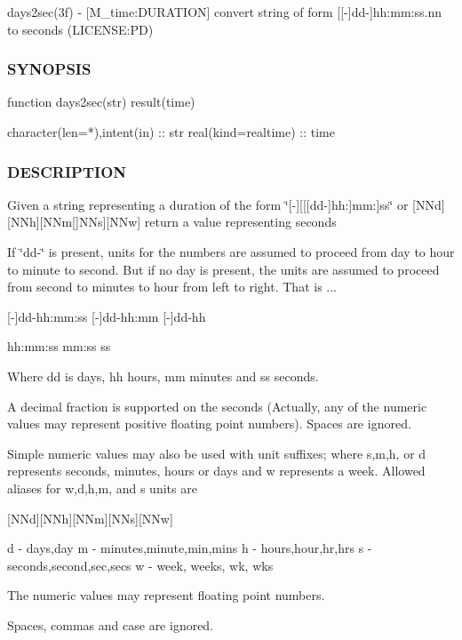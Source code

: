 days2sec(3f) -\/ \mbox{[}M\+\_\+time\+:D\+U\+R\+A\+T\+I\+ON\mbox{]} convert string of form \mbox{[}\mbox{[}-\/\mbox{]}dd-\/\mbox{]}hh\+:mm\+:ss.\+nn to seconds (L\+I\+C\+E\+N\+SE\+:PD) 

\subsubsection*{S\+Y\+N\+O\+P\+S\+IS}

\begin{DoxyVerb}function days2sec(str) result(time)

 character(len=*),intent(in)       :: str
 real(kind=realtime)               :: time
\end{DoxyVerb}


\subsubsection*{D\+E\+S\+C\+R\+I\+P\+T\+I\+ON}

Given a string representing a duration of the form \char`\"{}\mbox{[}-\/\mbox{]}\mbox{[}\mbox{[}\mbox{[}dd-\/\mbox{]}hh\+:\mbox{]}mm\+:\mbox{]}ss\char`\"{} or \mbox{[}N\+Nd\mbox{]}\mbox{[}N\+Nh\mbox{]}\mbox{[}N\+Nm\mbox{[}\mbox{]}N\+Ns\mbox{]}\mbox{[}N\+Nw\mbox{]} return a value representing seconds

If \char`\"{}dd-\/\char`\"{} is present, units for the numbers are assumed to proceed from day to hour to minute to second. But if no day is present, the units are assumed to proceed from second to minutes to hour from left to right. That is ...

\mbox{[}-\/\mbox{]}dd-\/hh\+:mm\+:ss \mbox{[}-\/\mbox{]}dd-\/hh\+:mm \mbox{[}-\/\mbox{]}dd-\/hh

hh\+:mm\+:ss mm\+:ss ss

Where dd is days, hh hours, mm minutes and ss seconds.

A decimal fraction is supported on the seconds (Actually, any of the numeric values may represent positive floating point numbers). Spaces are ignored.

\begin{DoxyVerb}  Simple numeric values may also be used with unit suffixes; where
  s,m,h, or d represents seconds, minutes, hours or days and w
  represents a week. Allowed aliases for w,d,h,m, and s units are

    [NNd][NNh][NNm][NNs][NNw]

      d -  days,day
      m -  minutes,minute,min,mins
      h -  hours,hour,hr,hrs
      s -  seconds,second,sec,secs
      w -  week, weeks, wk, wks

  The numeric values may represent floating point numbers.

  Spaces, commas and case are ignored.
\end{DoxyVerb}


